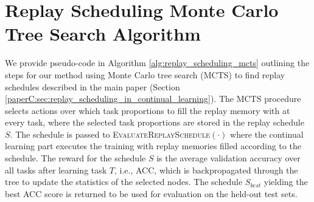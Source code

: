 

\section[Replay Scheduling MCTS Algorithm]{Replay Scheduling Monte Carlo Tree Search Algorithm}\label{paperC:app:rs_mcts_algorithm}





We provide pseudo-code in Algorithm \ref{alg:replay_scheduling_mcts} outlining the steps for our method using Monte Carlo tree search (MCTS) to find replay schedules described in the main paper (Section \ref{paperC:sec:replay_scheduling_in_continual_learning}). The MCTS procedure selects actions over which task proportions to fill the replay memory with at every task, where the selected task proportions are stored in the replay schedule $S$. The schedule is passed to \textsc{EvaluateReplaySchedule$(\cdot)$} where the continual learning part executes the training with replay memories filled according to the schedule. The reward for the schedule $S$ is the average validation accuracy over all tasks after learning task $T$, i.e., ACC, which is backpropagated through the tree to update the statistics of the selected nodes. The schedule $S_{best}$ yielding the best ACC score is returned to be used for evaluation on the held-out test sets.

